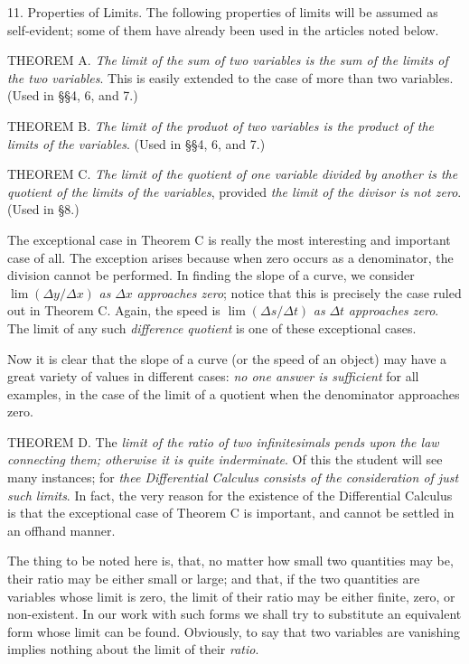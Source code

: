 \documentclass[12pt]{article}
\begin{document}
11. Properties of Limits.
The following properties of limits
will be assumed as self-evident; some of them have already
been used in the articles noted below.

THEOREM A. {\it The limit of the sum of two variables is the sum
of the limits of the two variables}. This is easily extended to the
case of more than two variables. (Used in \S\S 4, 6, and 7.)

THEOREM B. {\it The limit of the produot of two variables is the
product of the limits of the variables}. (Used in \S\S 4, 6, and 7.)

THEOREM C. {\it The limit of the quotient of one variable divided
by another is the quotient of the limits of the variables}, provided
{\it the limit of the divisor is not zero}. (Used in \S 8.)

The exceptional case in Theorem $\mathrm{C}$ is really the most 
interesting and important case of all. The exception arises
because when zero occurs as a denominator, the division 
cannot be performed. In finding the slope of a curve, we consider
$\displaystyle \lim(\Delta y/\Delta x)$ {\it as} $\Delta x$ {\it approaches zero}; notice that this is precisely the case ruled out in Theorem C. Again, the speed is
$\displaystyle \lim(\Delta s/\Delta t)$ {\it as} $\Delta t$ {\it approaches zero}. The limit of any such
{\it difference quotient} is one of these exceptional cases.

Now it is clear that the slope of a curve (or the speed of an
object) may have a great variety of values in different cases:
{\it no one answer is sufficient} for all examples, in the case of the
limit of a quotient when the denominator approaches zero.

THEOREM D. The {\it limit of the ratio of two infinitesimals
pends upon the law connecting them; otherwise it is quite inderminate}. 
Of this the student will see many instances; for
{\it thee Differential Calculus consists of the consideration of just
such limits}. In fact, the very reason for the existence of the 
Differential Calculus is that the exceptional case of Theorem 
$\mathrm{C}$ is important, and cannot be settled in an offhand manner.

The thing to be noted here is, that, no matter how small two
quantities may be, their ratio may be either small or large;
and that, if the two quantities are variables whose limit is
zero, the limit of their ratio may be either finite, zero, or
non-existent. In our work with such forms we shall try to
substitute an equivalent form whose limit can be found.
Obviously, to say that two variables are vanishing implies
nothing about the limit of their {\it ratio}.
\end{document}
